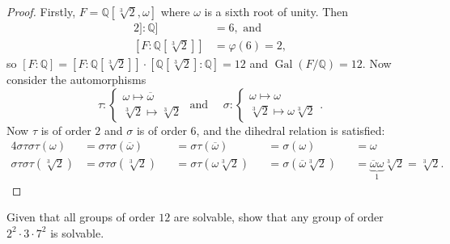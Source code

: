 \documentclass{article}
\newenvironment{problem}[2][Problem]{\begin{trivlist}
\item[\hskip \labelsep {\bfseries #1}\hskip \labelsep {\bfseries #2.}]}{\end{trivlist}}
\newcommand{\Q}{\mathbb Q}
\newcommand{\Gal}{\operatorname{Gal}}
\begin{document}
\begin{proof}
  Firstly, $F = \Q[\sqrt[3]2, \omega]$ where $\omega$ is a sixth root of unity.
  Then \begin{align*}
    [\Q[\sqrt[3]2]:\Q] &= 6, \text{ and} \\
    [F:\Q[\sqrt[3]2]] &= \varphi(6) = 2,
  \end{align*}
  so $[F:\Q] = [F:\Q[\sqrt[3]2]]\cdot[\Q[\sqrt[3]2]:\Q] = 12$ and
  $\Gal(F/\Q) = 12$.
  Now consider the automorphisms \[
    \tau: \begin{cases}
      \omega \mapsto \overline\omega \\
      \sqrt[3]2 \mapsto \sqrt[3]2
    \end{cases} \text{ and ~~~}
    \sigma: \begin{cases}
        \omega \mapsto \omega \\
        \sqrt[3]2 \mapsto \omega\sqrt[3]2
      \end{cases}.
  \]
  Now $\tau$ is of order $2$ and $\sigma$ is of order $6$, and the dihedral
  relation is satisfied: \begin{alignat*}{4}
    \sigma\tau\sigma\tau(\omega) &= \sigma\tau\sigma(\overline\omega) &&= \sigma\tau(\overline\omega) &&= \sigma(\omega) &&= \omega \\
    \sigma\tau\sigma\tau(\sqrt[3]2) &= \sigma\tau\sigma(\sqrt[3]2) &&= \sigma\tau(\omega\sqrt[3]2) &&= \sigma(\overline\omega\sqrt[3]2) &&= \underbrace{\overline\omega\omega}_1\sqrt[3]2 = \sqrt[3]2.
  \end{alignat*}
\end{proof}
\pagebreak

\begin{problem}{6}
  Given that all groups of order $12$ are solvable, show that any group of order $2^2 \cdot 3 \cdot 7^2$ is solvable.
\end{problem}
\end{document}
